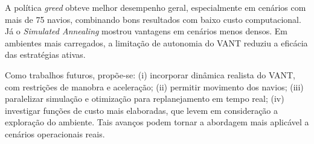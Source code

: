 A política \textit{greed} obteve melhor desempenho geral, especialmente em cenários com mais de 75 navios, combinando bons resultados com baixo custo computacional. Já o \textit{Simulated Annealing} mostrou vantagens em cenários menos densos. Em ambientes mais carregados, a limitação de autonomia do VANT reduziu a eficácia das estratégias ativas.

Como trabalhos futuros, propõe-se: (i) incorporar dinâmica realista do VANT, com restrições de manobra e aceleração; (ii) permitir movimento dos navios; (iii) paralelizar simulação e otimização para replanejamento em tempo real; (iv) investigar funções de custo mais elaboradas, que levem em consideração a exploração do ambiente. Tais avanços podem tornar a abordagem mais aplicável a cenários operacionais reais.